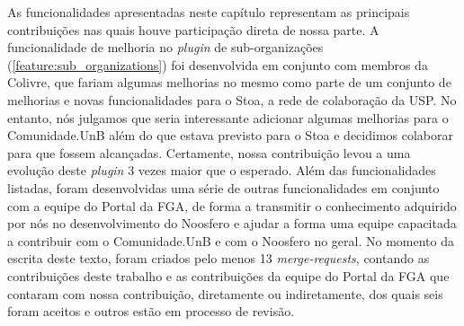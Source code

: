 As funcionalidades apresentadas neste capítulo representam as principais
contribuições nas quais houve participação direta de nossa parte. A
funcionalidade de melhoria no \textit{plugin} de sub-organizações
(\ref{feature:sub_organizations}) foi desenvolvida em conjunto com membros
da Colivre, que fariam algumas melhorias no mesmo como parte de um conjunto de
melhorias e novas funcionalidades para o Stoa, a rede de colaboração da USP.
%
No entanto, nós julgamos que seria interessante adicionar algumas melhorias para
o Comunidade.UnB além do que estava previsto para o Stoa e decidimos colaborar para que fossem
alcançadas. Certamente, nossa contribuição levou a uma evolução deste \textit{plugin}
3 vezes maior que o esperado.
%
Além das funcionalidades listadas, foram desenvolvidas uma série de outras
funcionalidades em conjunto com a equipe do Portal da FGA, de forma a
transmitir o conhecimento adquirido por nós no desenvolvimento do Noosfero
e ajudar a forma uma equipe capacitada a contribuir com o Comunidade.UnB
e com o Noosfero no geral. No momento da escrita deste texto, foram criados
pelo menos 13 \textit{merge-requests}, contando as contribuições deste trabalho
e as contribuições da equipe do Portal da FGA que contaram com nossa contribuição,
diretamente ou indiretamente, dos quais seis foram aceitos e outros estão em
processo de revisão.

